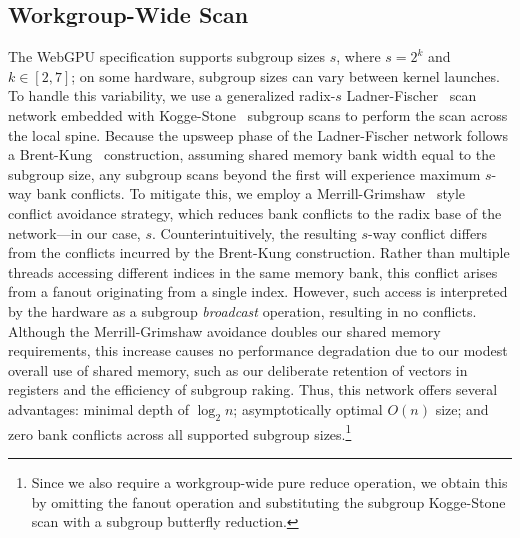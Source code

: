 \documentclass[sigconf]{acmart}
\begin{document}
\subsection{Workgroup-Wide Scan}
The WebGPU specification supports subgroup sizes $s$, where $s = 2^k$ and $k \in [2, 7]$; on some hardware, subgroup sizes can vary between kernel launches. To handle this variability, we use a generalized radix-$s$ Ladner-Fischer~\cite{} scan network embedded with Kogge-Stone~\cite{} subgroup scans to perform the scan across the local spine. Because the upsweep phase of the Ladner-Fischer network follows a Brent-Kung~\cite{1675982} construction, assuming shared memory bank width equal to the subgroup size, any subgroup scans beyond the first will experience maximum $s$-way bank conflicts. To mitigate this, we employ a Merrill-Grimshaw~\cite[Section 3.3.5]{Merrill2009} style conflict avoidance strategy, which reduces bank conflicts to the radix base of the network—in our case, $s$. Counterintuitively, the resulting $s$-way conflict differs from the conflicts incurred by the Brent-Kung construction. Rather than multiple threads accessing different indices in the same memory bank, this conflict arises from a fanout originating from a single index. However, such access is interpreted by the hardware as a subgroup \emph{broadcast} operation, resulting in no conflicts. Although the Merrill-Grimshaw avoidance doubles our shared memory requirements, this increase causes no performance degradation due to our modest overall use of shared memory, such as our deliberate retention of vectors in registers and the efficiency of subgroup raking. Thus, this network offers several advantages: minimal depth of $\log_2 n$; asymptotically optimal $O(n)$ size; and zero bank conflicts across all supported subgroup sizes.\footnote{Since we also require a workgroup-wide pure reduce operation, we obtain this by omitting the fanout operation and substituting the subgroup Kogge-Stone scan with a subgroup butterfly reduction.}
\end{document}
